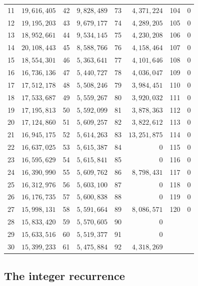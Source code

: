 \documentclass[11pt]{article}
\theoremstyle{definition}
\theoremstyle{remark}
\begin{document}
\begin{table}[H]
\begin{tabular}{rr@{\qquad}rr@{\qquad}rr@{\qquad}rr}
11 & $19{,}616{,}405$ & 42 & $9{,}828{,}489$ & 73 & $4{,}371{,}224$ & 104 & $0$\\
12 & $19{,}195{,}203$ & 43 & $9{,}679{,}177$ & 74 & $4{,}289{,}205$ & 105 & $0$\\
13 & $18{,}952{,}661$ & 44 & $9{,}534{,}145$ & 75 & $4{,}230{,}208$ & 106 & $0$\\
14 & $20{,}108{,}443$ & 45 & $8{,}588{,}766$ & 76 & $4{,}158{,}464$ & 107 & $0$\\
15 & $18{,}554{,}301$ & 46 & $5{,}363{,}641$ & 77 & $4{,}101{,}646$ & 108 & $0$\\
16 & $16{,}736{,}136$ & 47 & $5{,}440{,}727$ & 78 & $4{,}036{,}047$ & 109 & $0$\\
17 & $17{,}512{,}178$ & 48 & $5{,}508{,}246$ & 79 & $3{,}984{,}451$ & 110 & $0$\\
18 & $17{,}533{,}687$ & 49 & $5{,}559{,}267$ & 80 & $3{,}920{,}032$ & 111 & $0$\\
19 & $17{,}195{,}813$ & 50 & $5{,}592{,}099$ & 81 & $3{,}878{,}363$ & 112 & $0$\\
20 & $17{,}124{,}860$ & 51 & $5{,}609{,}257$ & 82 & $3{,}822{,}612$ & 113 & $0$\\
21 & $16{,}945{,}175$ & 52 & $5{,}614{,}263$ & 83 & $13{,}251{,}875$ & 114 & $0$\\
22 & $16{,}637{,}025$ & 53 & $5{,}615{,}387$ & 84 & $0$ & 115 & $0$\\
23 & $16{,}595{,}629$ & 54 & $5{,}615{,}841$ & 85 & $0$ & 116 & $0$\\
24 & $16{,}390{,}990$ & 55 & $5{,}609{,}762$ & 86 & $8{,}798{,}431$ & 117 & $0$\\
25 & $16{,}312{,}976$ & 56 & $5{,}603{,}100$ & 87 & $0$ & 118 & $0$\\
26 & $16{,}176{,}735$ & 57 & $5{,}600{,}838$ & 88 & $0$ & 119 & $0$\\
27 & $15{,}998{,}131$ & 58 & $5{,}591{,}664$ & 89 & $8{,}086{,}571$ & 120 & $0$\\
28 & $15{,}833{,}420$ & 59 & $5{,}570{,}605$ & 90 & $0$ &  & \\
29 & $15{,}633{,}516$ & 60 & $5{,}519{,}377$ & 91 & $0$ &  & \\
30 & $15{,}399{,}233$ & 61 & $5{,}475{,}884$ & 92 & $4{,}318{,}269$ &  & \\
\bottomrule
\end{tabular}
\end{table}

\subsection{The integer recurrence}
\end{document}
